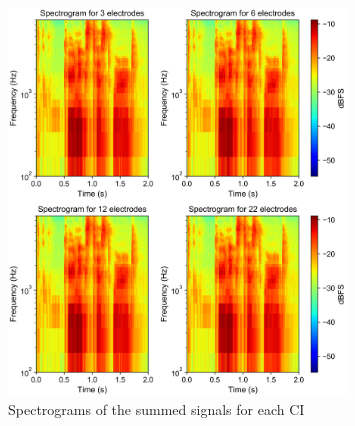 \documentclass{scrartcl}
\begin{document}
\begin{figure}[p]
	\centering
	\includegraphics[width=0.8\textwidth]{figures/spectrograms}
	\caption{Spectrograms of the summed signals for each CI}
	\label{fig:spectrograms}
\end{figure}
\end{document}
